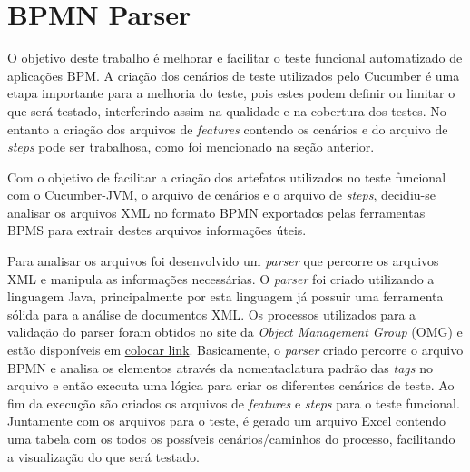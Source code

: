 \documentclass[12pt]{article}
\begin{document}
\section{BPMN Parser}
O objetivo deste trabalho é melhorar e facilitar o teste funcional automatizado de aplicações BPM. A criação dos cenários de teste utilizados pelo Cucumber é uma etapa importante para a melhoria do teste, pois estes podem definir ou limitar o que será testado, interferindo assim na qualidade e na cobertura dos testes. No entanto a criação dos arquivos de \emph{features} contendo os cenários e do arquivo de \emph{steps} pode ser trabalhosa, como foi mencionado na seção anterior.

Com o objetivo de facilitar a criação dos artefatos utilizados no teste funcional com o Cucumber-JVM, o arquivo de cenários e o arquivo de \emph{steps}, decidiu-se analisar os arquivos XML no formato BPMN exportados pelas ferramentas BPMS para extrair destes arquivos informações úteis. 

Para analisar os arquivos foi desenvolvido um \emph{parser} que percorre os arquivos XML e manipula as informações necessárias. O \emph{parser} foi criado utilizando a linguagem Java, principalmente por esta linguagem já possuir uma ferramenta sólida para a análise de documentos XML\cite{javadom}.  Os processos utilizados para a validação do parser foram obtidos no site da \emph{Object Management Group} (OMG) e estão disponíveis em \href{https://colocar link}{colocar link}. Basicamente, o \emph{parser} criado percorre o arquivo BPMN e analisa os elementos através da nomentaclatura padrão das \emph{tags} no arquivo e então executa uma lógica para criar os diferentes cenários de teste. Ao fim da execução são criados os arquivos de \emph{features} e \emph{steps} para o teste funcional. Juntamente com os arquivos para o teste, é gerado um arquivo Excel contendo uma tabela com os todos os possíveis cenários/caminhos do processo, facilitando a visualização do que será testado.

\end{document}
